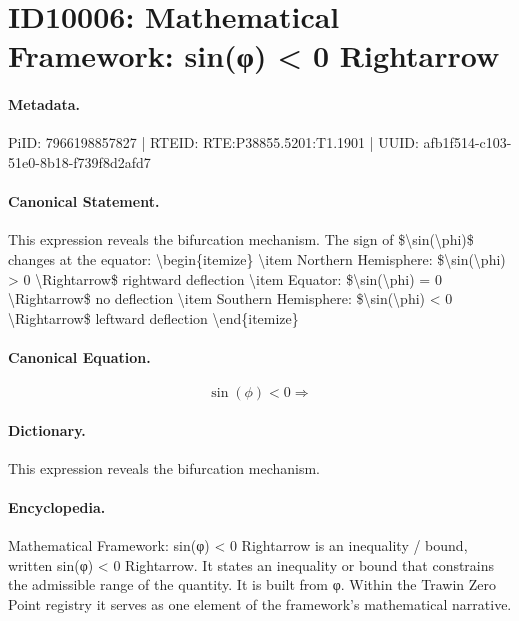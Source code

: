 \section*{ID10006: Mathematical Framework: sin(φ) < 0 Rightarrow}
\paragraph{Metadata.}
PiID: 7966198857827 | RTEID: RTE:P38855.5201:T1.1901 | UUID: afb1f514-c103-51e0-8b18-f739f8d2afd7

\paragraph{Canonical Statement.}
This expression reveals the bifurcation mechanism. The sign of \$\textbackslash{}sin(\textbackslash{}phi)\$ changes at the equator: \textbackslash{}begin\{itemize\} \textbackslash{}item Northern Hemisphere: \$\textbackslash{}sin(\textbackslash{}phi) > 0 \textbackslash{}Rightarrow\$ rightward deflection \textbackslash{}item Equator: \$\textbackslash{}sin(\textbackslash{}phi) = 0 \textbackslash{}Rightarrow\$ no deflection \textbackslash{}item Southern Hemisphere: \$\textbackslash{}sin(\textbackslash{}phi) < 0 \textbackslash{}Rightarrow\$ leftward deflection \textbackslash{}end\{itemize\}

\paragraph{Canonical Equation.}
\[
\sin(\phi) < 0 \Rightarrow
\]

\paragraph{Dictionary.}
This expression reveals the bifurcation mechanism.

\paragraph{Encyclopedia.}
Mathematical Framework: sin(φ) < 0 Rightarrow is an inequality / bound, written sin(φ) < 0 Rightarrow. It states an inequality or bound that constrains the admissible range of the quantity. It is built from φ. Within the Trawin Zero Point registry it serves as one element of the framework's mathematical narrative.
